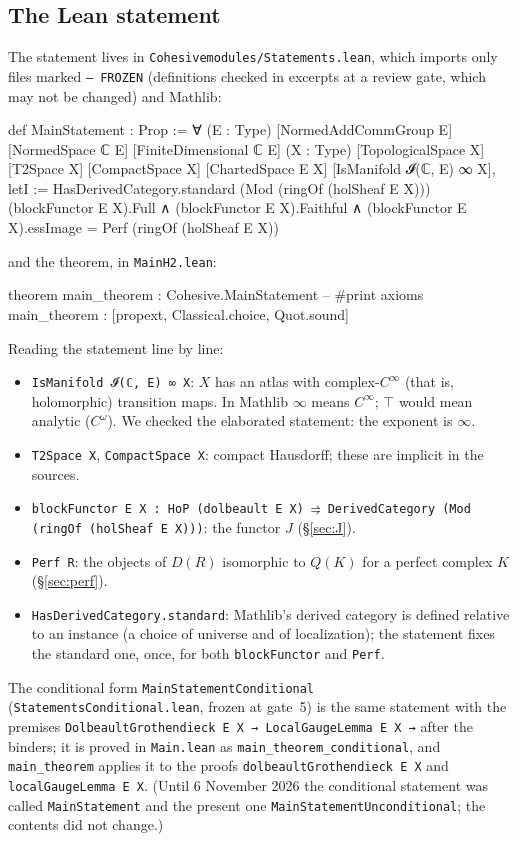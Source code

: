 \documentclass[11pt,a4paper]{article}
\newcommand{\code}[1]{\texttt{#1}}
\begin{document}
\subsection{The Lean statement}
The statement lives in \code{Cohesivemodules/Statements.lean}, which imports only files marked
\code{-- FROZEN} (definitions checked in excerpts at a review gate, which may not be changed)
and Mathlib:
\begin{lean}
def MainStatement : Prop :=
  ∀ (E : Type) [NormedAddCommGroup E] [NormedSpace ℂ E] [FiniteDimensional ℂ E]
    (X : Type) [TopologicalSpace X] [T2Space X] [CompactSpace X]
    [ChartedSpace E X] [IsManifold 𝓘(ℂ, E) ∞ X],
      letI := HasDerivedCategory.standard (Mod (ringOf (holSheaf E X)))
      (blockFunctor E X).Full ∧ (blockFunctor E X).Faithful ∧
        (blockFunctor E X).essImage = Perf (ringOf (holSheaf E X))
\end{lean}
and the theorem, in \code{MainH2.lean}:
\begin{lean}
theorem main_theorem : Cohesive.MainStatement
-- #print axioms main_theorem : [propext, Classical.choice, Quot.sound]
\end{lean}
Reading the statement line by line:
\begin{itemize}
\item \code{IsManifold 𝓘(ℂ, E) ∞ X}: $X$ has an atlas with complex-$C^\infty$ (that is,
holomorphic) transition maps. In Mathlib $\infty$ means $C^\infty$; $\top$ would mean
analytic ($C^\omega$). We checked the elaborated statement: the exponent is $\infty$.
\item \code{T2Space X}, \code{CompactSpace X}: compact Hausdorff; these are implicit in the
sources.
\item \code{blockFunctor E X : HoP (dolbeault E X) ⥤ DerivedCategory (Mod (ringOf (holSheaf E X)))}:
the functor $J$ (\S\ref{sec:J}).
\item \code{Perf R}: the objects of $D(R)$ isomorphic to $Q(K)$ for a perfect complex $K$
(\S\ref{sec:perf}).
\item \code{HasDerivedCategory.standard}: Mathlib's derived category is defined relative to an
instance (a choice of universe and of localization); the statement fixes the standard one,
once, for both \code{blockFunctor} and \code{Perf}.
\end{itemize}
The conditional form \code{MainStatementConditional} (\code{StatementsConditional.lean}, frozen
at gate~5) is the same statement with the premises
\code{DolbeaultGrothendieck E X → LocalGaugeLemma E X →} after the binders; it is proved in
\code{Main.lean} as \code{main\_theorem\_conditional}, and \code{main\_theorem} applies it to the
proofs \code{dolbeaultGrothendieck E X} and \code{localGaugeLemma E X}. (Until 6 November 2026
the conditional statement was called \code{MainStatement} and the present one
\code{MainStatementUnconditional}; the contents did not change.)
\end{document}
